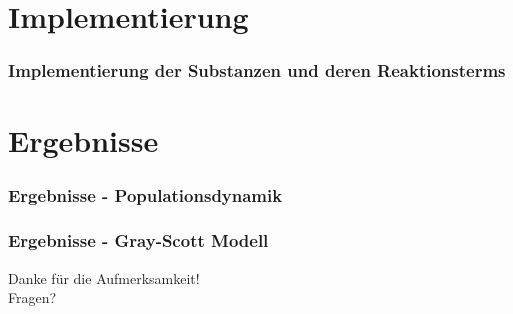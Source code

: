 \documentclass[aspectratio=32]{beamer}
\newcommand{\sectionframe}{\begin{frame}
	\begin{center}
		\textcolor{simtechred}{\Large\insertsection}
	\end{center}
\end{frame}}
\begin{document}
\section{Implementierung}
\sectionframe

\begin{frame}
\frametitle{Implementierung der Substanzen und deren Reaktionsterms}

\end{frame}

\section{Ergebnisse}
\sectionframe

\begin{frame}
\frametitle{Ergebnisse - Populationsdynamik}

\end{frame}

\begin{frame}
\frametitle{Ergebnisse - Gray-Scott Modell}

\end{frame}

%
%


\begin{frame}
\begin{center}
\Large
\textcolor{simtechred}{Danke für die Aufmerksamkeit! \\ Fragen?}
\end{center}
\end{frame}
\end{document}
